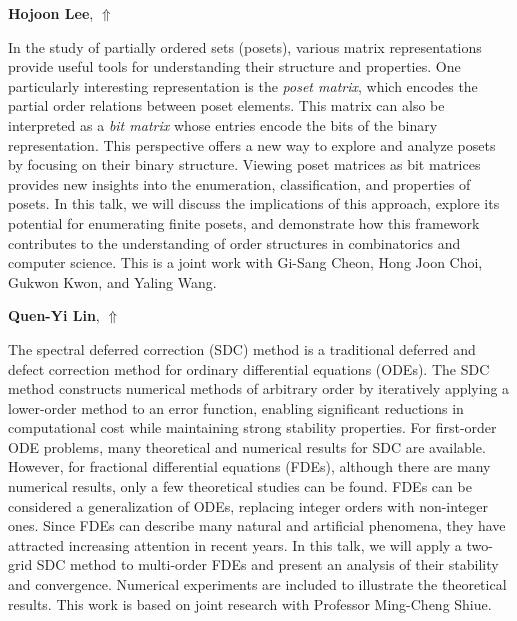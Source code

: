 \documentclass[ILAS2025-program.tex]{subfiles}
\begin{document}
\hypertarget{down0395}{}\begin{ilasabstract}
    
\textbf{Hojoon Lee},  \hfill \hyperlink{up0395}{$\Uparrow$}
    
    
\mtskip
    In the study of partially ordered sets (posets), various matrix representations provide useful tools for understanding their structure and properties. One particularly interesting representation is the {\it poset matrix}, which encodes the partial order relations between poset elements. This matrix can also be interpreted as a {\it bit matrix} whose entries encode the bits of the binary representation. This perspective offers a new way to explore and analyze posets by focusing on their binary structure. Viewing poset matrices as bit matrices provides new insights into the enumeration, classification, and properties of posets. In this talk, we will discuss the implications of this approach, explore its potential for enumerating finite posets, and demonstrate how this framework contributes to the understanding of order structures in combinatorics and computer science.
This is a joint work with Gi-Sang Cheon, Hong Joon Choi, Gukwon Kwon, and Yaling Wang.

\end{ilasabstract}
    

\hypertarget{down0412}{}\begin{ilasabstract}
    
\textbf{Quen-Yi Lin},  \hfill \hyperlink{up0412}{$\Uparrow$}
    
    
\mtskip
    The spectral deferred correction (SDC) method is a traditional deferred and defect correction method for ordinary differential equations (ODEs).
The SDC method constructs numerical methods of arbitrary order by iteratively applying a lower-order method to an error function,
enabling significant reductions in computational cost while maintaining strong stability properties.
For first-order ODE problems, many theoretical and numerical results for SDC are available.
However, for fractional differential equations (FDEs), although there are many numerical results, only a few theoretical studies can be found.
FDEs can be considered a generalization of ODEs, replacing integer orders with non-integer ones.
Since FDEs can describe many natural and artificial phenomena, they have attracted increasing attention in recent years.
In this talk, we will apply a two-grid SDC method to multi-order FDEs and present an analysis of their stability and convergence.
Numerical experiments are included to illustrate the theoretical results.
This work is based on joint research with Professor Ming-Cheng Shiue.

\end{ilasabstract}
    
\end{document}
